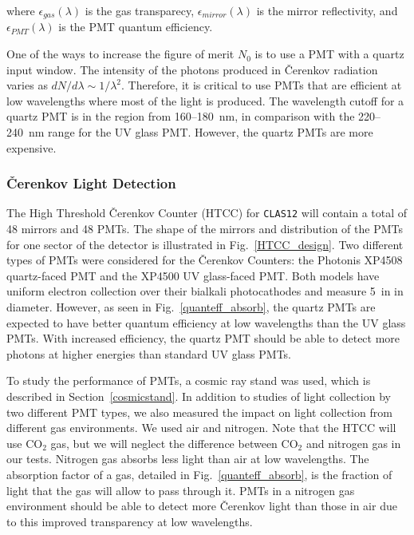 \noindent
where $\epsilon_{gas}(\lambda)$ is the gas transparecy,
$\epsilon_{mirror}(\lambda)$ is the mirror reflectivity, and
$\epsilon_{PMT}(\lambda)$ is the PMT quantum efficiency.

One of the ways to increase the figure of merit $N_0$ is to use a PMT with 
a quartz input window.  The intensity of the photons produced in 
{\v C}erenkov radiation varies as $dN/d\lambda\sim1/\lambda^2$.  Therefore, 
it is critical to use PMTs that are efficient at low wavelengths where most 
of the light is produced.  The wavelength cutoff for a quartz PMT is in the 
region from 160--180~nm, in comparison with the 220--240~nm range for the 
UV glass PMT.  However, the quartz PMTs are more expensive.
 
\subsubsection{{\v C}erenkov Light Detection}
\label{sec:Cerenkov-Light-Detection}

The High Threshold {\v C}erenkov Counter (HTCC) for {\tt CLAS12} will 
contain a total of 48 mirrors and 48 PMTs.  The shape of the mirrors
and distribution of the PMTs for one sector of the detector is illustrated
in Fig.~\ref{HTCC_design}.  Two different types of PMTs were considered for 
the {\v C}erenkov Counters: the Photonis XP4508 quartz-faced PMT and the 
XP4500 UV glass-faced PMT.  Both models have uniform electron collection 
over their bialkali photocathodes and measure 5~in in diameter.  However, 
as seen in Fig.~\ref{quanteff_absorb}, the quartz PMTs are expected to have 
better quantum efficiency at low wavelengths than the UV glass PMTs. With 
increased efficiency, the quartz PMT should be able to detect more photons 
at higher energies than standard UV glass PMTs.
 
To study the performance of PMTs, a cosmic ray stand was used, which is 
described in Section~\ref{cosmicstand}.  In addition to studies of light 
collection by two different PMT types, we also measured the impact on light 
collection from different gas environments.  We used air and nitrogen.
Note that the HTCC will use CO$_2$ gas, but we will neglect the difference 
between CO$_2$ and nitrogen gas in our tests.  Nitrogen gas absorbs less 
light than air at low wavelengths.  The absorption factor of a gas, detailed 
in Fig.~\ref{quanteff_absorb}, is the fraction of light that the gas will 
allow to pass through it.  PMTs in a nitrogen gas environment should be able 
to detect more {\v C}erenkov light than those in air due to this improved 
transparency at low wavelengths. 

